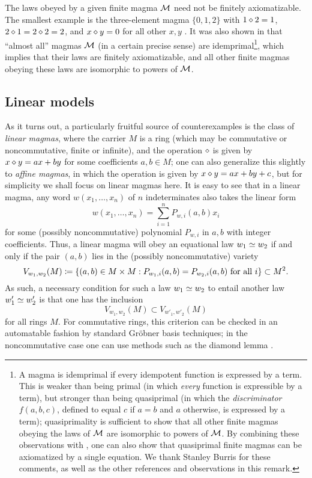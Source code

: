 \begin{remark} The laws obeyed by a given finite magma ${\mathcal{M}}$ need not be finitely axiomatizable.  The smallest example is the three-element magma $\{0,1,2\}$ with $1 \diamond 2 = 1$, $2 \diamond 1 = 2 \diamond 2 = 2$, and $x \diamond y = 0$ for all other $x,y$ \cite{murskii-1}.  It was also shown in \cite{murskii-2} that ``almost all'' magmas ${\mathcal{M}}$ (in a certain precise sense) are idemprimal\footnote{A magma is idemprimal if every idempotent function is expressed by a term.  This is weaker than being primal (in which \emph{every} function is expressible by a term), but stronger than being quasiprimal (in which the \emph{discriminator} $f(a,b,c)$, defined to equal $c$ if $a=b$ and $a$ otherwise, is expressed by a term); quasiprimality is sufficient to show that all other finite magmas obeying the laws of ${\mathcal{M}}$ are isomorphic to powers of ${\mathcal{M}}$.  By combining these observations with \cite{Padmanabhan}, one can also show that quasiprimal finite magmas can be axiomatized by a single equation.  We thank Stanley Burris for these comments, as well as the other references and observations in this remark.}, which implies that their laws are finitely axiomatizable, and all other finite magmas obeying these laws are isomorphic to powers of ${\mathcal{M}}$.
\end{remark}

\subsection{Linear models}\label{linear-sec}

As it turns out, a particularly fruitful source of counterexamples is the class of \emph{linear magmas}, where the carrier $M$ is a ring (which may be commutative or noncommutative, finite or infinite), and the operation $\diamond$ is given by $x \diamond y = ax + by$ for some coefficients $a,b \in M$; one can also generalize this slightly to \emph{affine magmas}, in which the operation is given by $x \diamond y = ax + by + c$, but for simplicity we shall focus on linear magmas here.  It is easy to see that in a linear magma, any word $w(x_1,\dots,x_n)$ of $n$ indeterminates also takes the linear form
$$ w(x_1,\dots,x_n) = \sum_{i=1}^n P_{w,i}(a,b) x_i$$
for some (possibly noncommutative) polynomial $P_{w,i}$ in $a,b$ with integer coefficients.  Thus, a linear magma will obey an equational law $w_1 \simeq w_2$ if and only if the pair $(a,b)$ lies in the (possibly noncommutative) variety
\begin{equation}\label{variety}
  V_{w_1,w_2}(M) \coloneqq \{ (a,b) \in M \times M: P_{w_1,i}(a,b) = P_{w_2,i}(a,b) \hbox{ for all } i \} \subset M^2.
\end{equation}
As such, a necessary condition for such a law $w_1 \simeq w_2$ to entail another law $w'_1 \simeq w'_2$ is that one has the inclusion
$$ V_{w_1,w_2}(M) \subset V_{w'_1,w'_2}(M)
$$
for all rings $M$.  For commutative rings, this criterion can be checked in an automatable fashion by standard Gr\"obner basis techniques; in the noncommutative case one can use methods such as the diamond lemma \cite{diamond-lemma}.

